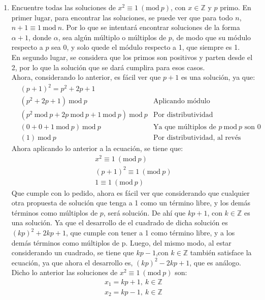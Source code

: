 \documentclass[letter]{article}
\begin{document}
\begin{pregunta}{2}
\begin{enumerate}
		\item Encuentre todas las soluciones de $x^2 \equiv 1 \ (\text{mod} \ p)$, con $x \in \mathbb{Z}$ y $p$ primo.
		En primer lugar, para encontrar las soluciones, se puede ver que para todo $n$, $n + 1 \equiv 1 \ \text{mod} \ n$. Por lo que se intentará encontrar soluciones de la forma $\alpha + 1$, donde $\alpha$, sea algún múltiplo o múltiplos de $p$, de modo que su módulo respecto a $p$ sea 0, y solo quede el módulo respecto a 1, que siempre es 1.\\		
		En segundo lugar, se considera que los primos son positivos y parten desde el 2, por lo que la solución que se dará cumplira para esos casos.\\
		Ahora, considerando lo anterior, es fácil ver que $p+1$ es una solución, ya que:
		\begin{align*}
			&(p+1)^2 = p^2 + 2p + 1 & \\
			&(p^2 + 2p + 1) \ \text{mod} \ p & \text{Aplicando módulo}\\
			&(p^2 \ \text{mod} \ p + 2p \ \text{mod} \ p + 1 \ \text{mod} \ p) \ \text{mod} \ p & \text{Por distributividad}\\
			&(0 + 0 + 1 \ \text{mod} \ p) \ \text{mod} \ p & \text{Ya que múltiplos de } p \ \text{mod} \ p \text{ son 0}\\
			&(1) \ \text{mod} \ p & \text{Por distributividad, al revés}
		\end{align*}
		Ahora aplicando lo anterior a la ecuación, se tiene que:
		\begin{align*}
			x^2 \equiv 1 \ (\text{mod} \ p)\\
			(p+1)^2 \equiv 1 \ (\text{mod} \ p)\\
			1 \equiv 1 \ (\text{mod} \ p)
		\end{align*}
		Que cumple con lo pedido, ahora es fácil ver que considerando que cualquier otra propuesta de solución que tenga a 1 como un término libre, y los demás términos como múltiplos de $p$, será solución.
		De ahí que $kp + 1$, con $k \in \mathbb{Z}$ es una solución. Ya que el desarrollo de el cuadrado de dicha solución es $(kp)^2 + 2kp + 1$, que cumple con tener a 1 como término libre, y a los demás términos como múltiplos de p.
		Luego, del mismo modo, al estar considerando un cuadrado, se tiene que $kp - 1$,con $k \in \mathbb{Z}$ también satisface la ecuación, ya que ahora el desarrollo es, $(kp)^2 - 2kp + 1$, que es análogo.
		Dicho lo anterior las soluciones de $x^2 \equiv 1 \ (\text{mod} \ p)$ son:
		\begin{gather*}
			x_1 = kp + 1, \ k \in \mathbb{Z}\\
			x_2 = kp - 1, \ k \in \mathbb{Z}
		\end{gather*}
		

\end{enumerate}
\end{pregunta}
\end{document}
